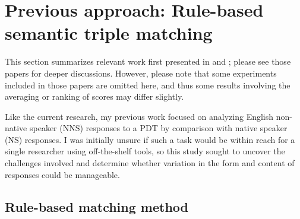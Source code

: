 \section{Previous approach: Rule-based semantic triple matching}
\label{sec:first-approaches}
This section summarizes relevant work first presented in \citet{king:dickinson:13} and \citet{king:dickinson:14}; please see those papers for deeper discussions. However, please note that some experiments included in those papers are omitted here, and thus some results involving the averaging or ranking of scores may differ slightly.

Like the current research, my previous work focused on analyzing English non-native speaker (NNS) responses to a PDT by comparison with native speaker (NS) responses. I was initially unsure if such a task would be within reach for a single researcher using off-the-shelf tools, so this study sought to uncover the challenges involved and determine whether variation in the form and content of responses could be manageable.



\subsection{Rule-based matching method}
\label{sec:rule-method}

